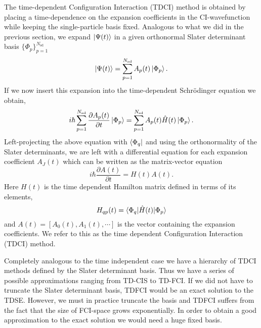 \documentclass[aip,jcp,reprint,floatfix]{revtex4-1}
\begin{document}
The time-dependent Configuration Interaction (TDCI) method is obtained
by placing a time-dependence on the expansion coefficients in the
CI-wavefunction while keeping the single-particle basis
fixed. Analogous to what we did in the previous section, we expand
$\ket{\Psi(t)}$ in a given orthonormal Slater determinant basis $\{
\Phi_p\}_{p=1}^{N_{\text{sd}}}$
\begin{equation}
 \ket{\Psi(t)} = \sum_{p=1}^{N_{\text{sd}}} A_p(t) \ket{\Phi_p}.
\end{equation}
If we now insert this expansion into the time-dependent Schrödinger equation we obtain,
\begin{equation}
 i \hbar  \sum_{p=1}^{N_{\text{sd}}} \frac{\partial A_p(t)}{\partial t} \ket{\Phi_p} =  \sum_{p=1}^{N_{\text{sd}}} A_p(t) \hat{H}(t) \ket{\Phi_p}. 
\end{equation}
Left-projecting the above equation with $\bra{\Phi_q}$ and using the
orthonormality of the Slater determinants, we are left with a
differential equation for each expansion coefficient $A_J(t)$ which
can be written as the matrix-vector equation
\begin{equation}
 i\hbar \frac{\partial A(t)}{\partial t} = H(t)A(t). \label{TDFCIEquation}
\end{equation}
Here $H(t)$ is the time dependent Hamilton matrix defined in terms of its elements,
\begin{equation}
 H_{qp}(t) = \braket{\Phi_q|\hat{H}(t)|\Phi_p}
\end{equation}
and $A(t) = [A_0(t), A_1(t), \cdots]$ is the vector containing the
expansion coefficients. We refer to this as the time dependent
Configuration Interaction (TDCI) method.

Completely analogous to the time independent case we have a hierarchy
of TDCI methods defined by the Slater determinant basis. Thus we have
a series of possible approximations ranging from TD-CIS to TD-FCI.  If
we did not have to truncate the Slater determinant basis, TDFCI would
be an exact solution to the TDSE.  However, we must in practice
truncate the basis and TDFCI suffers from the fact that the size of
FCI-space grows exponentially.  In order to obtain a good
approximation to the exact solution we would need a huge fixed
basis\cite{Kvaal12}.
\end{document}
